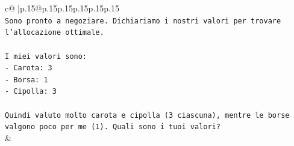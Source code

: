 \documentclass{article}
\begin{document}
{\begin{supertabular}{c@{$\;$}|p{.15\linewidth}@{}p{.15\linewidth}p{.15\linewidth}p{.15\linewidth}p{.15\linewidth}p{.15\linewidth}}
{{{\\ 
\texttt{Sono pronto a negoziare. Dichiariamo i nostri valori per trovare l'allocazione ottimale.} \\
\\ 
\texttt{I miei valori sono:} \\
\texttt{{-} Carota: 3} \\
\texttt{{-} Borsa: 1} \\
\texttt{{-} Cipolla: 3} \\
\\ 
\texttt{Quindi valuto molto carota e cipolla (3 ciascuna), mentre le borse valgono poco per me (1). Quali sono i tuoi valori?} \\
            }
        }
    }
    & \\ \\


\end{supertabular}}
\end{document}
